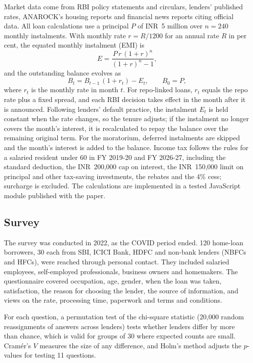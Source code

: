 \documentclass[sn-basic]{sn-jnl}
\newcommand{\INR}{INR~}
\begin{document}
Market data come from RBI policy statements and circulars, lenders' published rates, ANAROCK's housing reports and financial news reports citing official data. All loan calculations use a principal $P$ of \INR 5 million over $n = 240$ monthly instalments. With monthly rate $r = R/1200$ for an annual rate $R$ in per cent, the equated monthly instalment (EMI) is
\begin{equation}
E = \frac{P\,r\,(1+r)^{n}}{(1+r)^{n}-1},\label{eq:emi}
\end{equation}
and the outstanding balance evolves as
\begin{equation}
B_{t} = B_{t-1}\,(1 + r_t) - E_t, \qquad B_0 = P,\label{eq:bal}
\end{equation}
where $r_t$ is the monthly rate in month $t$. For repo-linked loans, $r_t$ equals the repo rate plus a fixed spread, and each RBI decision takes effect in the month after it is announced. Following lenders' default practice, the instalment $E_t$ is held constant when the rate changes, so the tenure adjusts; if the instalment no longer covers the month's interest, it is recalculated to repay the balance over the remaining original term. For the moratorium, deferred instalments are skipped and the month's interest is added to the balance. Income tax follows the rules for a salaried resident under 60 in FY 2019-20 and FY 2026-27, including the standard deduction, the \INR 200,000 cap on interest, the \INR 150,000 limit on principal and other tax-saving investments, the rebates and the 4\% cess; surcharge is excluded. The calculations are implemented in a tested JavaScript module published with the paper.

\subsection{Survey}

The survey was conducted in 2022, as the COVID period ended. 120 home-loan borrowers, 30 each from SBI, ICICI Bank, HDFC and non-bank lenders (NBFCs and HFCs), were reached through personal contact. They included salaried employees, self-employed professionals, business owners and homemakers. The questionnaire covered occupation, age, gender, when the loan was taken, satisfaction, the reason for choosing the lender, the source of information, and views on the rate, processing time, paperwork and terms and conditions.

For each question, a permutation test of the chi-square statistic (20,000 random reassignments of answers across lenders) tests whether lenders differ by more than chance, which is valid for groups of 30 where expected counts are small. Cram\'er's $V$ measures the size of any difference, and Holm's method adjusts the $p$-values for testing 11 questions.
\end{document}

